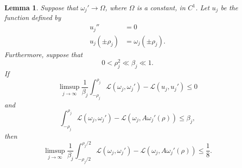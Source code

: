 \documentclass[reqno,12pt,letterpaper]{amsart}
\newcommand{\Lagrange}{\mathscr L}
\newtheorem{lemma}[theorem]{Lemma}
\theoremstyle{definition}
\numberwithin{equation}{section}
\begin{document}
\begin{lemma}
Suppose that $\omega_j' \to \Omega$, where $\Omega$ is a constant, in $C^1$.
Let $u_j$ be the function defined by
\begin{align*}
u_j'' &= 0 \\
u_j(\pm \rho_j) &= \omega_j(\pm \rho_j).
\end{align*}
Furthermore, suppose that
$$0 < \rho_j^2 \ll \beta_j \ll 1.$$
If
$$\limsup_{j \to \infty} \frac{1}{\beta_j} \int_{-\rho_j}^{\rho_j} \mathscr L(\omega_j, \omega_j') - \Lagrange(u_j, u_j') \leq 0$$
and
$$\int_{-\rho_j}^{\rho_j} \Lagrange(\omega_j, \omega_j') - \Lagrange(\omega_j, A \omega_j'(\rho)) \leq \beta_j,$$
then
$$\limsup_{j \to \infty} \frac{1}{\beta_j} \int_{-\rho_j/2}^{\rho_j/2} \Lagrange(\omega_j, \omega_j') - \Lagrange(\omega_j, A \omega_j'(\rho)) \leq \frac{1}{8}.$$
\end{lemma}
\end{document}
